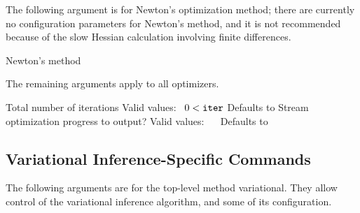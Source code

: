 %
The following argument is for Newton's optimization method;  there are
currently no configuration parameters for Newton's method, and it is
not recommended because of the slow Hessian calculation involving
finite differences.
%
\begin{description}
        {Newton's method}
%
\end{description}
%
The remaining arguments apply to all optimizers.
\begin{description}
%
      {Total number of iterations}
      {Valid values: \  $0 < \mbox{{\tt iter}}$}
      {Defaults to }
%
      {Stream optimization progress to output?}
      {Valid values: \  \ }
      {Defaults to }
%
\end{description}

\subsection{Variational Inference-Specific Commands}

The following arguments are for the top-level method \code
{variational}.
They allow control of the variational inference algorithm, and some of its
configuration.

